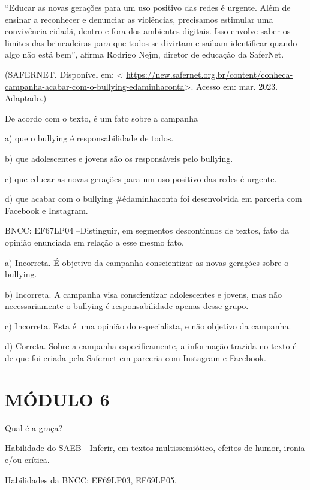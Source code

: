 ``Educar as novas gerações para um uso positivo das redes é urgente.
Além de ensinar a reconhecer e denunciar as violências, precisamos
estimular uma convivência cidadã, dentro e fora dos ambientes digitais.
Isso envolve saber os limites das brincadeiras para que todos se
divirtam e saibam identificar quando algo não está bem'', afirma Rodrigo
Nejm, diretor de educação da SaferNet.

(SAFERNET. Disponível em: \textless{}
\url{https://new.safernet.org.br/content/conheca-campanha-acabar-com-o-bullying-edaminhaconta}\textgreater.
Acesso em: mar. 2023. Adaptado.)

De acordo com o texto, é um fato sobre a campanha

a) que o bullying é responsabilidade de todos.

b) que adolescentes e jovens são os responsáveis pelo bullying.

c) que educar as novas gerações para um uso positivo das redes é
urgente.

d) que acabar com o bullying \#édaminhaconta foi desenvolvida em
parceria com Facebook e Instagram.

BNCC: EF67LP04 --Distinguir, em segmentos descontínuos de textos, fato
da opinião enunciada em relação a esse mesmo fato.

a) Incorreta. É objetivo da campanha conscientizar as novas gerações
sobre o bullying.

b) Incorreta. A campanha visa conscientizar adolescentes e jovens, mas
não necessariamente o bullying é responsabilidade apenas desse grupo.

c) Incorreta. Esta é uma opinião do especialista, e não objetivo da
campanha.

d) Correta. Sobre a campanha especificamente, a informação trazida no
texto é de que foi criada pela Safernet em parceria com Instagram e
Facebook.

\hypertarget{muxf3dulo-6}{%
\section{MÓDULO 6}\label{muxf3dulo-6}}

Qual é a graça?

Habilidade do SAEB - Inferir, em textos multissemiótico, efeitos de
humor, ironia e/ou crítica.

Habilidades da BNCC: EF69LP03, EF69LP05.

